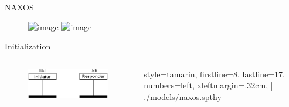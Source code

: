 \documentclass[11pt,aspectratio=169]{beamer}
\begin{document}

\begin{frame}[fragile,t]{NAXOS}
    \begin{figure}
        \includegraphics<1>[width=.5\textwidth]{./figures/lecture_6/naxos_1}%
        \includegraphics<2>[width=.5\textwidth]{./figures/lecture_6/naxos_2}%
    \end{figure}
\end{frame}

\begin{frame}[fragile]{Initialization}
    \begin{columns}
        \begin{column}{0.45\textwidth}
            \begin{figure}
                \includegraphics[width=.85\textwidth]
                    {./figures/lecture_6/naxos_pki}%
            \end{figure}
        \end{column}
        \begin{column}{0.55\textwidth}
            
                style=tamarin,
                firstline=8,
                lastline=17,
                numbers=left,
                xleftmargin=.32cm,
            ] {./models/naxos.spthy}
        \end{column}
    \end{columns}
\end{frame}
\end{document}
